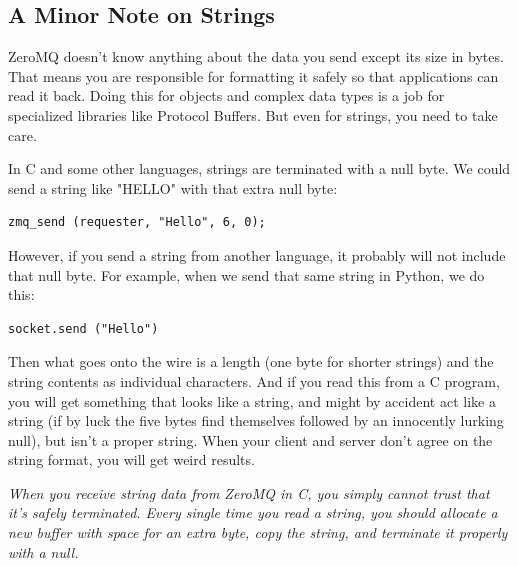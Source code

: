 \inputminted[baselinestretch=0.8,stripnl=false]{scheme}{../tests/hello-world/hello-world-system-components.scm}
\inputminted[baselinestretch=0.8,stripnl=false]{scheme}{../tests/hello-world/hello-world-system.scm}

\subsection{A Minor Note on Strings}

ZeroMQ doesn't know anything about the data you send except its size in bytes.
That means you are responsible for formatting it safely so that applications
can read it back. Doing this for objects and complex data types is a job for
specialized libraries like Protocol Buffers. But even for strings, you need to
take care.

In C and some other languages, strings are terminated with a null byte. We
could send a string like "HELLO" with that extra null byte:
\begin{verbatim}
zmq_send (requester, "Hello", 6, 0);
\end{verbatim}

However, if you send a string from another language, it probably will not
include that null byte. For example, when we send that same string in Python,
we do this:
\begin{verbatim}
socket.send ("Hello")
\end{verbatim}

Then what goes onto the wire is a length (one byte for shorter strings) and the
string contents as individual characters.
And if you read this from a C program, you will get something that looks like a
string, and might by accident act like a string (if by luck the five bytes find
themselves followed by an innocently lurking null), but isn't a proper string.
When your client and server don't agree on the string format, you will get
weird results.

\textit{When you receive string data from ZeroMQ in C, you simply cannot trust that
it's safely terminated. Every single time you read a string, you should
allocate a new buffer with space for an extra byte, copy the string, and
terminate it properly with a null.}

